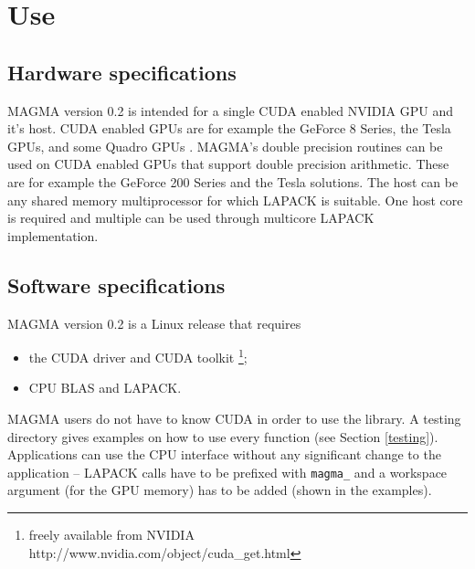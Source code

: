 \documentclass[10pt]{book}
\newcommand {\hhh} {\hspace{10mm}}
\begin{document}
\chapter{Use}\label{ch:use}

\section{Hardware specifications}\label{hardware}
MAGMA version 0.2 is intended for a single CUDA enabled NVIDIA GPU and 
it's host. CUDA enabled GPUs are for example the GeForce 8 Series, 
the Tesla GPUs, and some Quadro GPUs \cite{GPUManual}. MAGMA's double 
precision routines can be used on CUDA enabled GPUs that support double 
precision arithmetic. 
These are for example the GeForce 200 Series and the Tesla solutions.
The host can be any shared memory multiprocessor for which LAPACK is 
suitable. One host core is required and multiple can be used through
multicore LAPACK implementation.

\vspace{0.2in}
\section{Software specifications}
MAGMA version 0.2 is a Linux release that requires
\begin{itemize}
  \item the CUDA driver and CUDA toolkit
        \footnote{freely available from NVIDIA\\
                \hhh  http://www.nvidia.com/object/cuda\_get.html};
  \item CPU BLAS and LAPACK.
\end{itemize}

MAGMA users do not have to know CUDA in order to use the library. 
A testing directory gives examples on how to use every function (see Section 
\ref{testing}). Applications can use the CPU interface without any 
significant change to the application -- LAPACK calls have to be prefixed with
{\tt magma\_} and a workspace argument (for the GPU memory) has to be 
added (shown in the examples).
\end{document}
